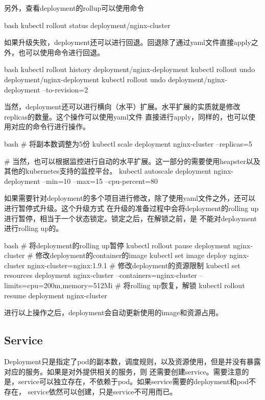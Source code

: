 另外，查看deployment的rollup可以使用命令
\begin{code-block}{bash}
kubectl rollout status deployment/nginx-cluster
\end{code-block}

如果升级失败，deployment还可以进行回退。回退除了通过yaml文件直接apply之外，也可以使用命令进行回退。
\begin{code-block}{bash}
kubectl rollout history deployment/nginx-deployment
kubectl rollout undo deployment/nginx-deployment
kubectl rollout undo deployment/nginx-deployment --to-revision=2
\end{code-block}

当然，deployment还可以进行横向（水平）扩展。水平扩展的实质就是修改replicas的数量。这个操作可以使用yaml文件
直接进行apply，同样的，也可以使用对应的命令行进行操作。
\begin{code-block}{bash}
# 将副本数调整为5份
kubectl scale deployment nginx-cluster --replicas=5

# 当然，也可以根据监控进行自动的水平扩展。这一部分的需要使用heapster以及其他的kubernetes支持的监控平台。
kubectl autoscale deployment nginx-deployment --min=10 --max=15 --cpu-percent=80
\end{code-block}

如果需要针对deployment的多个项目进行修改，除了使用yaml文件之外，还可以进行暂停式升级。这个升级方式
在升级的准备过程中会将deployment的rolling up进行暂停，相当于一个状态锁定。锁定之后，在解锁之前，是
不能对deployment进行rolling up的。
\begin{code-block}{bash}
# 将deployment的rolling up暂停
kubectl rollout pause deployment nginx-cluster
# 修改deployment的container的image
kubectl set image deploy nginx-cluster nginx-cluster=nginx:1.9.1
# 修改deployment的资源限制
kubectl set resources deployment nginx-cluster --containers=nginx-cluster --limits=cpu=200m,memory=512Mi
# 将rolling up恢复，解锁
kubectl rollout resume deployment nginx-cluster
\end{code-block}
进行以上操作之后，deployment会自动更新使用的image和资源占用。

\subsection{Service}
Deployment只是指定了pod的副本数，调度规则，以及资源使用，但是并没有暴露对应的服务。如果是对外提供相关的服务，则
还需要创建service。需要注意的是，service可以独立存在，不依赖于pod。如果service需要的deployment和pod不存在，
service依然可以创建，只是service不可用而已。

